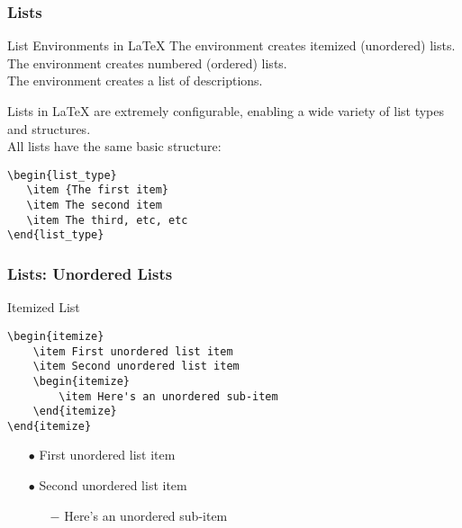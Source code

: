 \begin{frame}[fragile]
\frametitle{Lists}
\begin{block}{List Environments in \LaTeX{}}
The  environment creates itemized (unordered) lists. \\ \pause
The  environment creates numbered (ordered) lists. \\ \pause
The  environment creates a list of descriptions. \pause
\end{block}
Lists in \LaTeX{} are extremely configurable, enabling a wide variety of list types and structures. \\[\baselineskip] \pause
All lists have the same basic structure:
\begin{exampleblock}{}
\small
\begin{verbatim}
\begin{list_type}
   \item {The first item}
   \item The second item 
   \item The third, etc, etc
\end{list_type}
\end{verbatim}
\end{exampleblock}
\end{frame}


\begin{frame}[fragile]
\frametitle{Lists: Unordered Lists}
\begin{block}{Itemized List}
\begin{verbatim}
\begin{itemize}
    \item First unordered list item
    \item Second unordered list item
    \begin{itemize}
        \item Here's an unordered sub-item
    \end{itemize}
\end{itemize}
\end{verbatim}    
\end{block}
\begin{exampleblock}{}
\begin{itemize}
    \item[$\bullet$] First unordered list item
    \item[$\bullet$] Second unordered list item
    \begin{itemize}
        \item[$-$] Here's an unordered sub-item 
    \end{itemize}
\end{itemize}
\end{exampleblock}
\end{frame}


